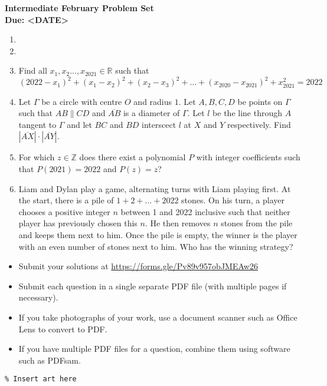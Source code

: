 \documentclass{article}
\begin{document}
\thispagestyle{empty}

\begin{center}
  \textbf{\Large Intermediate February Problem Set}
  \\ \vspace{1em}
  \textbf{\large Due: <DATE>}
\end{center}

\bigskip

\begin{enumerate}[itemsep=\fill]


\item %


\item %

\item %
Find all $x_1,x_2...,x_{2021} \in \mathbb{R}$ such that $$(2022-x_1)^2+(x_1-x_2)^2+(x_2-x_3)^2+...+(x_{2020}-x_{2021})^2+x_{2021}^2=2022$$


\item %
Let $\Gamma$ be a circle with centre $O$ and radius $1$. Let $A,B,C,D$ be points on $\Gamma$ such that $AB \parallel CD$ and $\overline{AB}$ is a diameter of $\Gamma$. Let $l$ be the line through $A$ tangent to $\Gamma$ and let $BC$ and $BD$ interscect $l$ at $X$ and $Y$ respectively. Find $|\overline{AX}| \cdot |\overline{AY}|$.  

\item %
For which $z \in \mathbb{Z}$ does there exist a polynomial $P$ with integer coefficients such that $P(2021)=2022$ and $P(z)=z$?

\item %
Liam and Dylan play a game, alternating turns with Liam playing first. At the start, there is a pile of $1+2+...+2022$ stones. On his turn, a player chooses a positive integer $n$ between 1 and 2022 inclusive such that neither player has previously chosen this $n$. He then removes $n$ stones from the pile and keeps them next to him. Once the pile is empty, the winner is the player with an even number of stones next to him. Who has the winning strategy? 

\end{enumerate}


\vfill
\small
\begin{itemize}
	\item Submit your solutions at \href{https://forms.gle/Pv89v957obJMEAw26}{https://forms.gle/Pv89v957obJMEAw26}
	\item Submit each question in a single separate PDF file (with multiple pages if necessary).
	\item If you take photographs of your work, use a document scanner such as Office Lens to convert to PDF.
	\item If you have multiple PDF files for a question, combine them using software such as PDFsam.
\end{itemize}

\vfill
\centering
\small
\begin{BVerbatim}
\end{BVerbatim}
\end{document}
